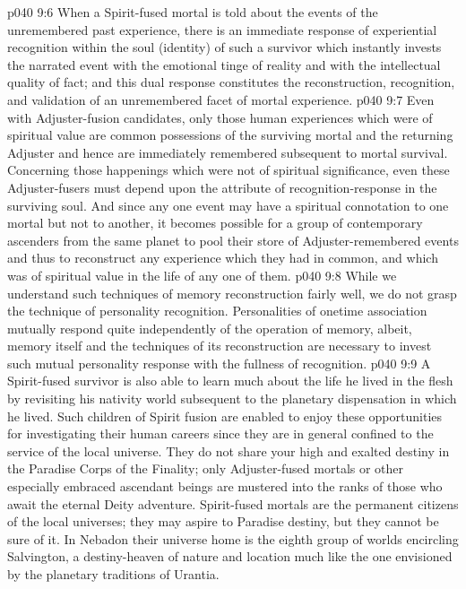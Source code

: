 \vs p040 9:6 When a Spirit\hyp{}fused mortal is told about the events of the unremembered past experience, there is an immediate response of experiential recognition within the soul (identity) of such a survivor which instantly invests the narrated event with the emotional tinge of reality and with the intellectual quality of fact; and this dual response constitutes the reconstruction, recognition, and validation of an unremembered facet of mortal experience.
\vs p040 9:7 Even with Adjuster\hyp{}fusion candidates, only those human experiences which were of spiritual value are common possessions of the surviving mortal and the returning Adjuster and hence are immediately remembered subsequent to mortal survival. Concerning those happenings which were not of spiritual significance, even these Adjuster\hyp{}fusers must depend upon the attribute of recognition\hyp{}response in the surviving soul. And since any one event may have a spiritual connotation to one mortal but not to another, it becomes possible for a group of contemporary ascenders from the same planet to pool their store of Adjuster\hyp{}remembered events and thus to reconstruct any experience which they had in common, and which was of spiritual value in the life of any one of them.
\pc \vs p040 9:8 While we understand such techniques of memory reconstruction fairly well, we do not grasp the technique of personality recognition. Personalities of onetime association mutually respond quite independently of the operation of memory, albeit, memory itself and the techniques of its reconstruction are necessary to invest such mutual personality response with the fullness of recognition.
\pc \vs p040 9:9 A Spirit\hyp{}fused survivor is also able to learn much about the life he lived in the flesh by revisiting his nativity world subsequent to the planetary dispensation in which he lived. Such children of Spirit fusion are enabled to enjoy these opportunities for investigating their human careers since they are in general confined to the service of the local universe. They do not share your high and exalted destiny in the Paradise Corps of the Finality; only Adjuster\hyp{}fused mortals or other especially embraced ascendant beings are mustered into the ranks of those who await the eternal Deity adventure. Spirit\hyp{}fused mortals are the permanent citizens of the local universes; they may aspire to Paradise destiny, but they cannot be sure of it. In Nebadon their universe home is the eighth group of worlds encircling Salvington, a destiny\hyp{}heaven of nature and location much like the one envisioned by the planetary traditions of Urantia.
